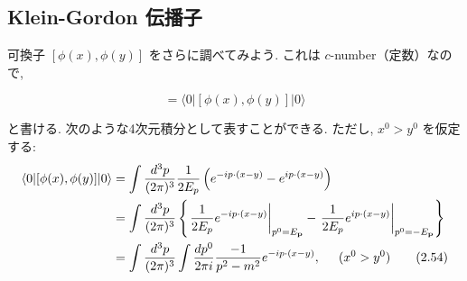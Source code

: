 \documentclass[a4paper,12pt]{article}
\begin{document}
\subsection*{Klein-Gordon 伝播子}

可換子 $[\phi(x), \phi(y)]$ をさらに調べてみよう. これは $c$-number（定数）なので,

\begin{equation*}
[\phi(x), \phi(y)] = \langle 0 | [\phi(x), \phi(y)] | 0 \rangle
\end{equation*}

と書ける. 次のような4次元積分として表すことができる. ただし, $x^0 > y^0$ を仮定する:
\begin{align*}
\langle 0 | [\phi(x), \phi(y)] | 0 \rangle &= \int \frac{d^3 p}{(2\pi)^3} \frac{1}{2E_p} \left( e^{-ip \cdot (x - y)} - e^{ip \cdot (x - y)} \right) \\
&= \int \frac{d^3 p}{(2\pi)^3} \left\{ \left.\frac{1}{2E_p} e^{-ip \cdot (x - y)}\right|_{p^0 = E_{\mathbf{p}}} - \left.\frac{1}{2E_p} e^{ip \cdot (x - y)}\right|_{p^0 = -E_{\mathbf{p}}} \right\}\\
&= \int \frac{d^3 p}{(2\pi)^3} \int \frac{dp^0}{2\pi i}\frac{-1}{p^2 -m^2} e^{-ip \cdot (x - y)},\hspace{0.5cm} (x^0 > y^0) \tag{2.54}
\end{align*}
\end{document}

